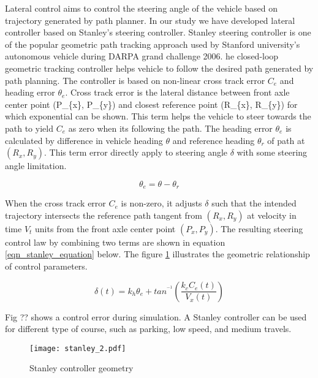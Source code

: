 \documentclass[10 pt,letterpaper,conference]{IEEEtran}
\begin{document}
Lateral control aims to control the steering angle of the vehicle based
on trajectory generated by path planner. In our study we have developed
lateral controller based on Stanley's \citep{ventures2006stanley}
steering controller. Stanley steering controller is one of the popular
geometric path tracking approach used by Stanford university's
autonomous vehicle during DARPA grand challenge 2006. he closed-loop
geometric tracking controller helps vehicle to follow the desired path
generated by path planning. The controller is based on non-linear cross
track error \(C_{e}\) and heading error \(\theta_{e}\). Cross track
error is the lateral distance between front axle center point (P\_\{x\},
P\_\{y\}) and closest reference point (R\_\{x\}, R\_\{y\}) for which
exponential can be shown\citep{ventures2006stanley}. This term helps the
vehicle to steer towards the path to yield \(C_{e}\) as zero when its
following the path. The heading error \(\theta_{e}\) is calculated by
difference in vehicle heading \(\theta\) and reference heading
\(\theta_{r}\) of path at \((R_{x}, R_{y})\). This term error directly
apply to steering angle \(\delta\) with some steering angle limitation.

\begin{equation}
\label{eqn_heading_error}
\theta_{e} = \theta - \theta_{r}
\end{equation}

When the cross track error \(C_{e}\) is non-zero, it adjusts \(\delta\)
such that the intended trajectory intersects the reference path tangent
from \((R_{x}, R_{y})\) at velocity in time \(V_{t}\) units from the
front axle center point \((P_{x}, P_{y})\). The resulting steering
control law by combining two terms are shown in equation
\ref{eqn_stanley_equation} below. The figure \ref{fig_stanley}
illustrates the geometric relationship of control parameters.

\begin{equation}
\label{eqn_stanley_equation}
\delta(t) = k_{h}\theta_{e} + tan^{^{-1}}\left (\frac{k_{c}C_{e}(t)}{V_{x}(t)}  \right )
\end{equation}

Fig ?? shows a control error during simulation. A Stanley controller can
be used for different type of course, such as parking, low speed, and
medium travels.

\begin{figure}[!t]
\centering
\texttt{[image: stanley\_2.pdf]}
\caption{Stanley controller geometry}
\label{fig_stanley}
\end{figure}
\end{document}
